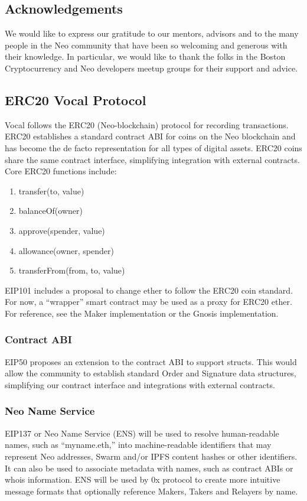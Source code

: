 \documentclass[conference]{IEEEtran}
\begin{document}
    \subsection{Acknowledgements}

    We would like to express our gratitude to our mentors, advisors and to the many people in the Neo community that have been so welcoming and generous with their knowledge. 
    In particular, we would like to thank the folks in the Boston Cryptocurrency and Neo developers meetup groups for their support and advice.

    \subsection{ERC20 Vocal Protocol}
   Vocal follows the ERC20 (Neo-blockchain) protocol for recording transactions.
    ERC20 establishes a standard contract ABI for coins on the Neo blockchain and has become the de facto representation for all types of digital assets. ERC20 coins share the same contract interface, simplifying integration with external contracts.
    Core ERC20 functions include:

    \begin{enumerate}
    \item transfer(to, value)
    \item balanceOf(owner)
    \item approve(spender, value)
    \item allowance(owner, spender)
    \item transferFrom(from, to, value)
    \end{enumerate}

    EIP101 includes a proposal to change ether to follow the ERC20 coin standard. For now, a “wrapper” smart contract may be used as a proxy for ERC20 ether. For reference, see the Maker implementation or the Gnosis implementation.
    \subsubsection{Contract ABI}
    EIP50 proposes an extension to the contract ABI to support structs. This would allow the community to establish standard Order and Signature data structures, simplifying our contract interface and integrations with external contracts.
    \subsubsection{Neo Name Service}
    EIP137 or Neo Name Service (ENS) will be used to resolve human-readable names, such as “myname.eth,” into machine-readable identifiers that may represent Neo addresses, Swarm and/or IPFS content hashes or other identifiers. It can also be used to associate metadata with names, such as contract ABIs or whois information. ENS will be used by 0x protocol to create more intuitive message formats that optionally reference Makers, Takers and Relayers by name.
 
\end{document}
